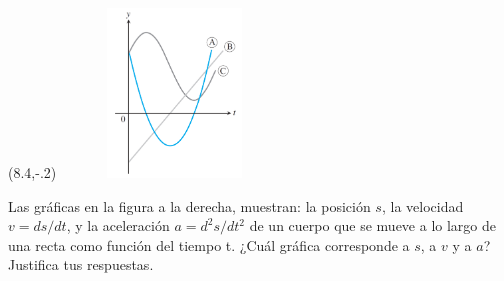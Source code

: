 \documentclass[10pt]{exam}
\begin{document}
\begin{questions}
\vskip15pt

    


\noindent
    \begin{textblock}{10}(8.4,-.2)
    \includegraphics[width=6cm,height=4.5cm]{Grad4T-E-1.pdf}
    \end{textblock} 

\begin{minipage}[t]{0.5\textwidth}
  \question Las gráficas en la figura a la derecha, muestran: la posición $s$, la velocidad $v=ds/dt$, y la aceleración $a=d^2s/dt^2$ de un cuerpo que se mueve a lo largo de una recta como función del tiempo t. ¿Cuál gráfica corresponde a $s$, a $v$ y a $a$? Justifica tus respuestas.
\end{minipage}
\begin{minipage}[t]{0.4\textwidth}
  \centering\raisebox{\dimexpr \topskip-\height}{
 \texttt{[image: ]}
}
\end{minipage}\hfill


\end{questions}
\end{document}
